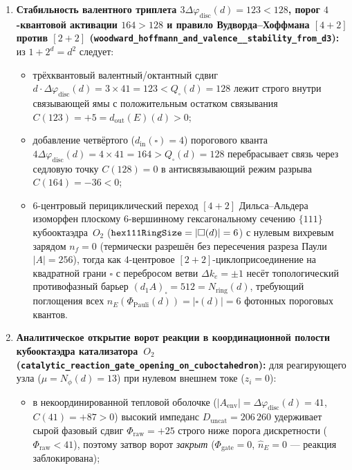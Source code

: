 \begin{theorem}[Аналитические теоремы химической кинетики, переходного состояния $|A^\ddagger|=128$, селективности Вудворда--Хоффмана и катализа на кубооктаэдре~$O_2$]
\begin{enumerate}[leftmargin=*]
\item \textbf{Стабильность валентного триплета $3\Delta\varphi_{\mathrm{disc}}(d) = 123 < 128$, порог $4$-квантовой активации $164 > 128$ и правило Вудворда--Хоффмана $[4+2]$ против $[2+2]$ (\texttt{woodward\_\allowbreak hoffmann\_\allowbreak and\_\allowbreak valence\_\_\allowbreak stability\_\allowbreak from\_\allowbreak d3}):}
  из $1+2^d=d^2$ следует:
  \begin{itemize}[nosep,leftmargin=*]
  \item трёхквантовый валентный/октантный сдвиг $d\cdot\Delta\varphi_{\mathrm{disc}}(d) = 3\times 41 = 123 < Q_\square(d) = 128$ лежит строго внутри связывающей ямы с положительным остатком связывания $C(123) = +5 = d_{\mathrm{out}}(E)(d) > 0$;
  \item добавление четвёртого ($d_{\mathrm{in}}(\square)=4$) порогового кванта $4\Delta\varphi_{\mathrm{disc}}(d) = 4\times 41 = 164 > Q_\square(d) = 128$ перебрасывает связь через седловую точку $C(128)=0$ в антисвязывающий режим разрыва $C(164) = -36 < 0$;
  \item $6$-центровый перициклический переход $[4+2]$ Дильса--Альдера изоморфен плоскому $6$-вершинному гексагональному сечению $\{111\}$ кубооктаэдра~$O_2$ ($\text{\texttt{hex111RingSize}} = |\square(d)| = 6$) с нулевым вихревым зарядом $n_f = 0$ (термически разрешён без пересечения разреза Паули $|A|=256$), тогда как $4$-центровое $[2+2]$-циклоприсоединение на квадратной грани $\square$ с перебросом ветви $\Delta k_e = \pm 1$ несёт топологический противофазный барьер $(d_1 A)_\square = 512 = N_{\mathrm{ring}}(d)$, требующий поглощения всех $\widehat{n}_E(\Phi_{\mathrm{Pauli}}(d)) = |\square(d)| = 6$ фотонных пороговых квантов.
  \end{itemize}
\item \textbf{Аналитическое открытие ворот реакции в координационной полости кубооктаэдра катализатора~$O_2$ (\texttt{catalytic\_\allowbreak reaction\_\allowbreak gate\_\allowbreak opening\_\allowbreak on\_\allowbreak cuboctahedron}):}
  для реагирующего узла ($\mu = N_\phi(d) = 13$) при нулевом внешнем токе ($z_i = 0$):
  \begin{itemize}[nosep,leftmargin=*]
  \item в некоординированной тепловой оболочке ($|A_{\mathrm{env}}| = \Delta\varphi_{\mathrm{disc}}(d) = 41$, $C(41) = +87 > 0$) высокий импеданс $D_{\mathrm{uncat}} = 206\,260$ удерживает сырой фазовый сдвиг $\Phi_{\mathrm{raw}} = +25$ строго ниже порога дискретности ($\Phi_{\mathrm{raw}} < 41$), поэтому затвор ворот \emph{закрыт} ($\Phi_{\mathrm{gate}} = 0$, $\widehat{n}_E = 0$ --- реакция заблокирована);

\end{itemize}
\end{enumerate}
\end{theorem}
